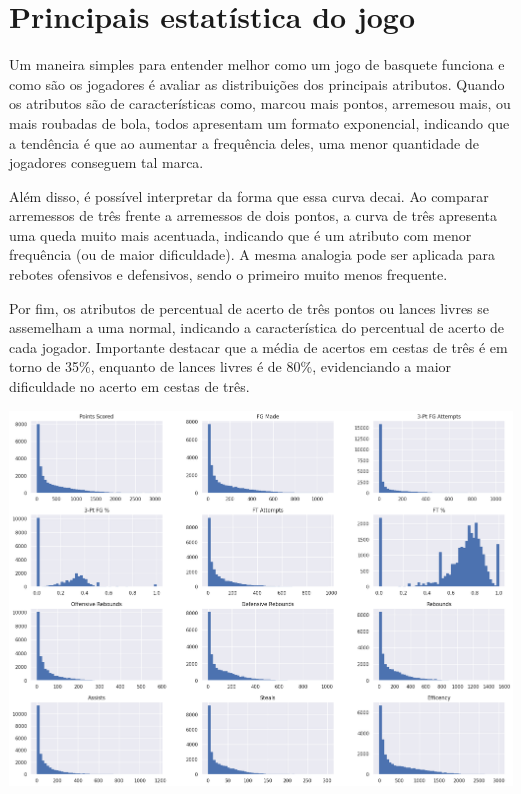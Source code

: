 \documentclass[
]{book}
\begin{document}
\hypertarget{principais-estatuxedstica-do-jogo}{%
\chapter{Principais estatística do jogo}\label{principais-estatuxedstica-do-jogo}}

Um maneira simples para entender melhor como um jogo de basquete funciona e como são os jogadores é avaliar as distribuições dos principais atributos. Quando os atributos são de características como, marcou mais pontos, arremesou mais, ou mais roubadas de bola, todos apresentam um formato exponencial, indicando que a tendência é que ao aumentar a frequência deles, uma menor quantidade de jogadores conseguem tal marca.

Além disso, é possível interpretar da forma que essa curva decai. Ao comparar arremessos de três frente a arremessos de dois pontos, a curva de três apresenta uma queda muito mais acentuada, indicando que é um atributo com menor frequência (ou de maior dificuldade). A mesma analogia pode ser aplicada para rebotes ofensivos e defensivos, sendo o primeiro muito menos frequente.

Por fim, os atributos de percentual de acerto de três pontos ou lances livres se assemelham a uma normal, indicando a característica do percentual de acerto de cada jogador. Importante destacar que a média de acertos em cestas de três é em torno de 35\%, enquanto de lances livres é de 80\%, evidenciando a maior dificuldade no acerto em cestas de três.

\includegraphics{imagens/15.png}
\end{document}
